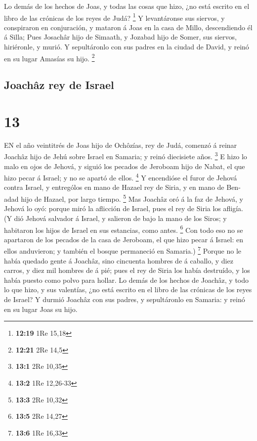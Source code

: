  Lo demás de los hechos de Joas, y todas las cosas que
hizo, ¿no está escrito en el libro de las crónicas de los reyes de Judá?
\footnote{\textbf{12:19} 1Re 15,18}  Y levantáronse sus
siervos, y conspiraron en conjuración, y mataron á Joas en la casa de
Millo, descendiendo él á Silla;  Pues Josachâr hijo de
Simaath, y Jozabad hijo de Somer, sus siervos, hiriéronle, y murió. Y
sepultáronlo con sus padres en la ciudad de David, y reinó en su lugar
Amasías su hijo. \footnote{\textbf{12:21} 2Re 14,5}

\hypertarget{joachuxe2z-rey-de-israel}{%
\subsection{Joachâz rey de Israel}\label{joachuxe2z-rey-de-israel}}

\hypertarget{section-12}{%
\section{13}\label{section-12}}

 EN el año veintitrés de Joas hijo de Ochôzías, rey de Judá,
comenzó á reinar Joachâz hijo de Jehú sobre Israel en Samaria; y reinó
diecisiete años. \footnote{\textbf{13:1} 2Re 10,35}  E hizo
lo malo en ojos de Jehová, y siguió los pecados de Jeroboam hijo de
Nabat, el que hizo pecar á Israel; y no se apartó de ellos. \footnote{\textbf{13:2}
  1Re 12,26-33}  Y encendióse el furor de Jehová contra
Israel, y entrególos en mano de Hazael rey de Siria, y en mano de
Ben-adad hijo de Hazael, por largo tiempo. \footnote{\textbf{13:3} 2Re
  10,32}  Mas Joachâz oró á la faz de Jehová, y Jehová lo
oyó: porque miró la aflicción de Israel, pues el rey de Siria los
afligía.  (Y dió Jehová salvador á Israel, y salieron de
bajo la mano de los Siros; y habitaron los hijos de Israel en sus
estancias, como antes. \footnote{\textbf{13:5} 2Re 14,27} 
Con todo eso no se apartaron de los pecados de la casa de Jeroboam, el
que hizo pecar á Israel: en ellos anduvieron; y también el bosque
permaneció en Samaria.) \footnote{\textbf{13:6} 1Re 16,33} 
Porque no le había quedado gente á Joachâz, sino cincuenta hombres de á
caballo, y diez carros, y diez mil hombres de á pié; pues el rey de
Siria los había destruído, y los había puesto como polvo para hollar.
 Lo demás de los hechos de Joachâz, y todo lo que hizo, y
sus valentías, ¿no está escrito en el libro de las crónicas de los reyes
de Israel?  Y durmió Joachâz con sus padres, y sepultáronlo
en Samaria: y reinó en su lugar Joas su hijo.


